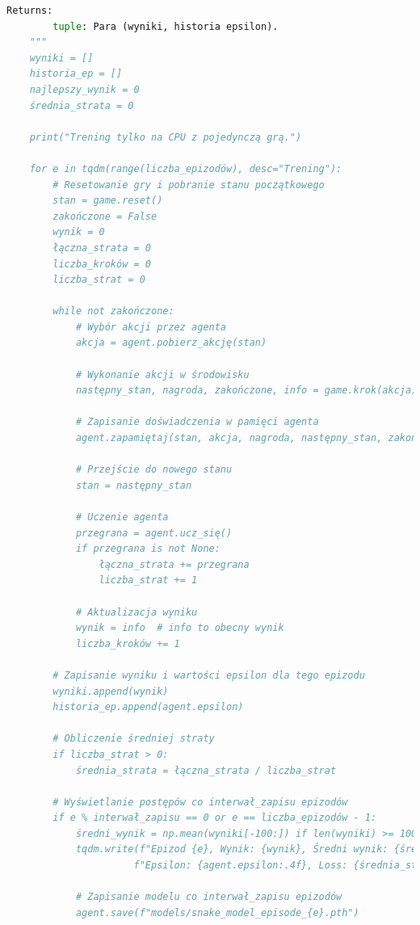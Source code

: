 \documentclass[a4paper,12pt]{article}
\begin{document}
\begin{lstlisting}[language=Python]
    Returns:
        tuple: Para (wyniki, historia epsilon).
    """
    wyniki = []
    historia_ep = []
    najlepszy_wynik = 0
    średnia_strata = 0
    
    print("Trening tylko na CPU z pojedynczą grą.")
    
    for e in tqdm(range(liczba_epizodów), desc="Trening"):
        # Resetowanie gry i pobranie stanu początkowego
        stan = game.reset()
        zakończone = False
        wynik = 0
        łączna_strata = 0
        liczba_kroków = 0
        liczba_strat = 0
        
        while not zakończone:
            # Wybór akcji przez agenta
            akcja = agent.pobierz_akcję(stan)
            
            # Wykonanie akcji w środowisku
            następny_stan, nagroda, zakończone, info = game.krok(akcja)
            
            # Zapisanie doświadczenia w pamięci agenta
            agent.zapamiętaj(stan, akcja, nagroda, następny_stan, zakończone)
            
            # Przejście do nowego stanu
            stan = następny_stan
            
            # Uczenie agenta
            przegrana = agent.ucz_się()
            if przegrana is not None:
                łączna_strata += przegrana
                liczba_strat += 1
            
            # Aktualizacja wyniku
            wynik = info  # info to obecny wynik
            liczba_kroków += 1
            
        # Zapisanie wyniku i wartości epsilon dla tego epizodu
        wyniki.append(wynik)
        historia_ep.append(agent.epsilon)
        
        # Obliczenie średniej straty
        if liczba_strat > 0:
            średnia_strata = łączna_strata / liczba_strat
        
        # Wyświetlanie postępów co interwał_zapisu epizodów
        if e % interwał_zapisu == 0 or e == liczba_epizodów - 1:
            średni_wynik = np.mean(wyniki[-100:]) if len(wyniki) >= 100 else np.mean(wyniki)
            tqdm.write(f"Epizod {e}, Wynik: {wynik}, Średni wynik: {średni_wynik:.2f}, "
                      f"Epsilon: {agent.epsilon:.4f}, Loss: {średnia_strata:.4f}")
            
            # Zapisanie modelu co interwał_zapisu epizodów
            agent.save(f"models/snake_model_episode_{e}.pth")
            

\end{lstlisting}
\end{document}
